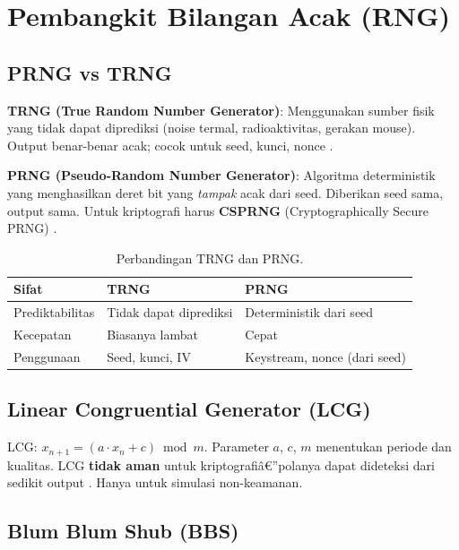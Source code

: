 ﻿\section{Pembangkit Bilangan Acak (RNG)}

\subsection{PRNG vs TRNG}

\textbf{TRNG (True Random Number Generator)}: Menggunakan sumber fisik yang tidak dapat diprediksi (noise termal, radioaktivitas, gerakan mouse). Output benar-benar acak; cocok untuk seed, kunci, nonce \cite{stallings2017}.

{\sloppy \textbf{PRNG (Pseudo-Random Number Generator)}: Algoritma deterministik yang menghasilkan deret bit yang \textit{tampak} acak dari seed. Diberikan seed sama, output sama. Untuk kriptografi harus \textbf{CSPRNG} (Cryptographically Secure PRNG) \cite{menezes1996}.\par}

\begin{table}[htbp]
  \centering
  \small
  \begin{tabular}{lll}
    \toprule
    Sifat & TRNG & PRNG \\
    \midrule
    Prediktabilitas & Tidak dapat diprediksi & Deterministik dari seed \\
    Kecepatan & Biasanya lambat & Cepat \\
    Penggunaan & Seed, kunci, IV & Keystream, nonce (dari seed) \\
    \bottomrule
  \end{tabular}
  \caption{Perbandingan TRNG dan PRNG.}
\end{table}

\subsection{Linear Congruential Generator (LCG)}

LCG: $x_{n+1} = (a \cdot x_n + c) \bmod m$. Parameter $a$, $c$, $m$ menentukan periode dan kualitas. LCG \textbf{tidak aman} untuk kriptografiâ€”polanya dapat dideteksi dari sedikit output \cite{schneier1996}. Hanya untuk simulasi non-keamanan.

\subsection{Blum Blum Shub (BBS)}

